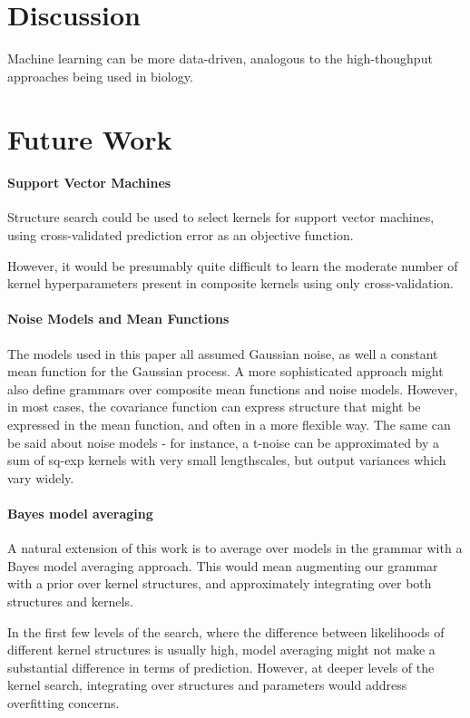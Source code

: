\documentclass[twoside]{article}
\begin{document}
\section{Discussion}

Machine learning can be more data-driven, analogous to the high-thoughput approaches being used in biology. 

\section{Future Work}

\paragraph{Support Vector Machines} Structure search could be used to select kernels for support vector machines, using cross-validated prediction error as an objective function.

However, it would be presumably quite difficult to learn the moderate number of kernel hyperparameters present in composite kernels using only cross-validation.

\paragraph{Noise Models and Mean Functions}

The models used in this paper all assumed Gaussian noise, as well a constant mean function for the Gaussian process.
A more sophisticated approach might also define grammars over composite mean functions and noise models.
However, in most cases, the covariance function can express structure that might be expressed in the mean function, and often in a more flexible way.
The same can be said about noise models - for instance, a t-noise can be approximated by a sum of sq-exp kernels with very small lengthscales, but output variances which vary widely.


\paragraph{Bayes model averaging}
A natural extension of this work is to average over models in the grammar with a Bayes model averaging approach.
This would mean augmenting our grammar with a prior over kernel structures, and approximately integrating over both structures and kernels.  

In the first few levels of the search, where the difference between likelihoods of different kernel structures is usually high, model averaging might not make a substantial difference in terms of prediction.
However, at deeper levels of the kernel search, integrating over structures and parameters would address overfitting concerns.
\end{document}
